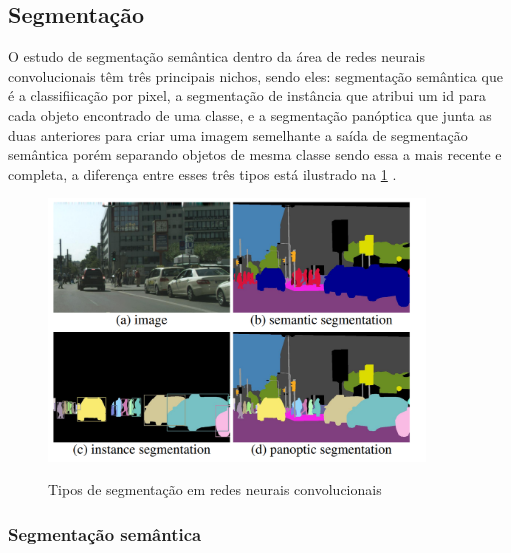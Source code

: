 \subsection{Segmentação}

O estudo de segmentação semântica dentro da área de redes neurais convolucionais têm três principais nichos, sendo eles: segmentação semântica que é a classifiicação por pixel, a segmentação de instância que atribui um id para cada objeto encontrado de uma classe, e a segmentação panóptica que junta as duas anteriores para criar uma imagem semelhante a saída de segmentação semântica porém separando objetos de mesma classe sendo essa a mais recente e completa, a diferença entre esses três tipos está ilustrado na \cref{fig:segentacoes} \cite{dp_semantic_segmantation, lapix}. 

\begin{figure}[H]
	\caption{Tipos de segmentação em redes neurais convolucionais}
	\centering %
	\includegraphics[width=10cm]{figures/segmantations.png} %
	\label{fig:segentacoes}
\end{figure}

\subsubsection*{Segmentação semântica}

